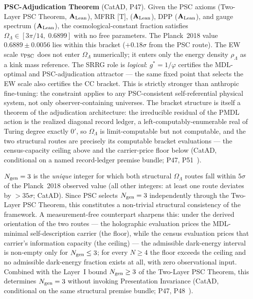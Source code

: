 \textbf{PSC-Adjudication Theorem} (CatAD, P47).  Given the PSC axioms (Two-Layer PSC Theorem,
$\mathbf{A}_{\rm Lean}$), MFRR [T],  ($\mathbf{A}_{\rm Lean}$),
DPP ($\mathbf{A}_{\rm Lean}$), and gauge spectrum ($\mathbf{A}_{\rm Lean}$), the
cosmological-constant fraction satisfies
$\Omega_\Lambda \in [3\pi/14,\; 0.6899]$ with no free parameters.
The Planck~2018 value $0.6889\pm0.0056$ lies within this bracket ($+0.18\sigma$
from the PSC route).  The EW scale $v_{\rm PSC}$ does not enter $\Omega_\Lambda$
numerically; it enters only the energy density $\rho_\Lambda$ as a kink mass
reference.  The SRRG role is \emph{logical}: $g^* = 1/\varphi$ certifies the
MDL-optimal and PSC-adjudication attractor --- the same fixed point that
selects the EW scale also certifies the CC bracket.  This is strictly
stronger than anthropic fine-tuning: the constraint applies to any PSC-consistent
self-referential physical system, not only observer-containing universes.
The bracket structure is itself a theorem of the adjudication architecture: the
irreducible residual of the PMDL action is the realized diagonal record ledger,
a left-computably-enumerable real of Turing degree exactly $0'$, so
$\Omega_\Lambda$ is limit-computable but not computable, and the two structural
routes are precisely its computable bracket evaluations --- the census-capacity
ceiling above and the carrier-price floor below (CatAD, conditional on a named
record-ledger premise bundle;
P47, P51~\cite{SpivackGTECosmology,SpivackPolynomialTransputation}).

$N_{\rm gen}=3$ is the \emph{unique} integer for which both structural
$\Omega_\Lambda$ routes fall within $5\sigma$ of the Planck~2018 observed value
(all other integers: at least one route deviates by $>35\sigma$; CatAD).
Since PSC selects $N_{\rm gen}=3$ independently through the Two-Layer PSC Theorem,
this constitutes a non-trivial structural consistency of the framework.
A measurement-free counterpart sharpens this: under the derived orientation of
the two routes --- the holographic evaluation prices the MDL-minimal
self-description carrier (the floor), while the census evaluation prices that
carrier's information capacity (the ceiling) --- the admissible dark-energy
interval is non-empty only for $N_{\rm gen} \leq 3$; for every $N \geq 4$ the
floor exceeds the ceiling and no admissible dark-energy fraction exists at all,
with zero observational input.  Combined with the Layer~I bound
$N_{\rm gen} \geq 3$ of the Two-Layer PSC Theorem, this determines
$N_{\rm gen} = 3$ without invoking Presentation Invariance (CatAD, conditional on
the same structural premise bundle;
P47, P48~\cite{SpivackGTECosmology,SpivackGTECompleteFramework}).

